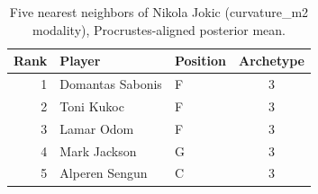 \begin{table}[htbp]
  \centering\small
  \begin{tabular}{rllc}
    \toprule
    Rank & Player & Position & Archetype \\
    \midrule
    1 & Domantas Sabonis & F & 3 \\
    2 & Toni Kukoc & F & 3 \\
    3 & Lamar Odom & F & 3 \\
    4 & Mark Jackson & G & 3 \\
    5 & Alperen Sengun & C & 3 \\
    \bottomrule
  \end{tabular}
  \caption{Five nearest neighbors of Nikola Jokic (curvature_m2 modality), Procrustes-aligned posterior mean.}
  \label{tab:Nikola_Jokic_neighbors_curvature_m2}
\end{table}

